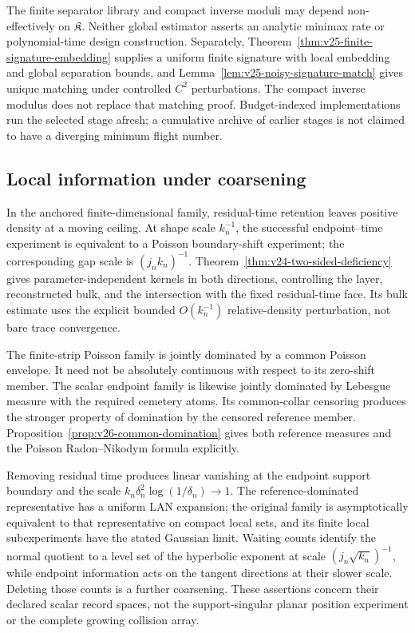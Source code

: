 The finite separator library and compact inverse moduli may depend
non-effectively on \(\mathfrak K\).  Neither global estimator asserts an
analytic minimax rate or polynomial-time design construction.  Separately,
Theorem~\ref{thm:v25-finite-signature-embedding} supplies a uniform finite
signature with local embedding and global separation bounds, and
Lemma~\ref{lem:v25-noisy-signature-match} gives unique matching under
controlled \(C^2\) perturbations.  The compact inverse modulus does not
replace that matching proof.  Budget-indexed implementations run the selected
stage afresh; a cumulative archive of earlier stages is not claimed to
have a diverging minimum flight number.

\subsection{Local information under coarsening}

In the anchored finite-dimensional family, residual-time retention leaves
positive density at a moving ceiling.  At shape scale \(k_n^{-1}\), the
successful endpoint--time experiment is equivalent to a Poisson boundary-shift
experiment; the corresponding gap scale is \((j_nk_n)^{-1}\).
Theorem~\ref{thm:v24-two-sided-deficiency} gives parameter-independent kernels
in both directions, controlling the layer, reconstructed bulk, and the
intersection with the fixed residual-time face.  Its bulk estimate uses the
explicit bounded \(O(k_n^{-1})\) relative-density perturbation, not bare
trace convergence.

The finite-strip Poisson family is jointly dominated by a common Poisson
envelope.  It need not be absolutely continuous with respect to its
zero-shift member.  The scalar endpoint family is likewise jointly dominated
by Lebesgue measure with the required cemetery atoms.  Its common-collar
censoring produces the stronger property of domination by the censored
reference member.  Proposition~\ref{prop:v26-common-domination} gives both
reference measures and the Poisson Radon--Nikodym formula explicitly.

Removing residual time produces linear vanishing at the endpoint support
boundary and the scale \(k_n\delta_n^2\log(1/\delta_n)\to1\).
The reference-dominated representative has a uniform LAN expansion; the
original family is asymptotically equivalent to that representative on
compact local sets, and its finite local subexperiments have the stated
Gaussian limit.  Waiting counts identify the normal quotient to a level
set of the hyperbolic exponent at scale \((j_n\sqrt{k_n})^{-1}\), while
endpoint information acts on the tangent directions at their slower scale.
Deleting those counts is a further coarsening.  These assertions concern
their declared scalar record spaces, not the support-singular planar
position experiment or the complete growing collision array.

